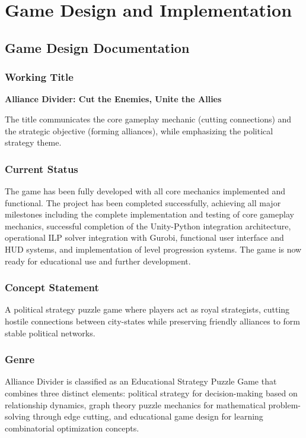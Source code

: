 \documentclass[english]{tudscrreprt}
\begin{document}
\chapter{Game Design and Implementation}

\section{Game Design Documentation}

\subsection{Working Title}
\textbf{Alliance Divider: Cut the Enemies, Unite the Allies}

The title communicates the core gameplay mechanic (cutting connections) and the strategic objective (forming alliances), while emphasizing the political strategy theme.

\subsection{Current Status}
The game has been fully developed with all core mechanics implemented and functional. The project has been completed successfully, achieving all major milestones including the complete implementation and testing of core gameplay mechanics, successful completion of the Unity-Python integration architecture, operational ILP solver integration with Gurobi, functional user interface and HUD systems, and implementation of level progression systems. The game is now ready for educational use and further development.

\subsection{Concept Statement}
A political strategy puzzle game where players act as royal strategists, cutting hostile connections between city-states while preserving friendly alliances to form stable political networks.

\subsection{Genre}
Alliance Divider is classified as an Educational Strategy Puzzle Game that combines three distinct elements: political strategy for decision-making based on relationship dynamics, graph theory puzzle mechanics for mathematical problem-solving through edge cutting, and educational game design for learning combinatorial optimization concepts.
\end{document}
